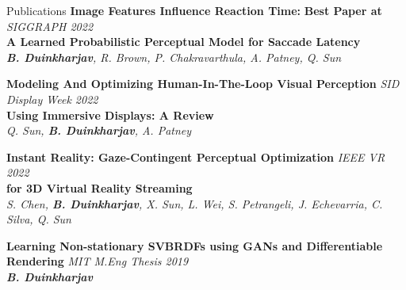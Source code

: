 \documentclass{resume}
\begin{document}
\begin{area}{Publications}
        \textbf{Image Features Influence Reaction Time:}
        \hfill
        \textbf{Best Paper at}
        \emph{SIGGRAPH 2022}\\
        \textbf{A Learned Probabilistic Perceptual Model for Saccade Latency}
        \\%
        \hspace*{2mm}
        \emph{\textbf{B. Duinkharjav}, R. Brown, P. Chakravarthula, A. Patney, Q. Sun}
    \newpage
    \item
        \textbf{Modeling And Optimizing Human-In-The-Loop Visual
        Perception}
        \hfill
        \emph{SID Display Week 2022}\\
        \textbf{Using Immersive Displays: A Review}
        \\%
        \hspace*{2mm}
        \emph{Q. Sun, \textbf{B. Duinkharjav}, A. Patney}
    \item
        \textbf{Instant Reality: Gaze-Contingent Perceptual Optimization}
        \hfill
        \emph{IEEE VR 2022}\\
        \textbf{for 3D Virtual Reality Streaming}
        \\%
        \hspace*{2mm}
        \emph{S. Chen, \textbf{B. Duinkharjav}, X. Sun, L. Wei, S. Petrangeli, J. Echevarria, C. Silva, Q. Sun}
    \item
        \textbf{Learning Non-stationary SVBRDFs using GANs and Differentiable Rendering}
        \hfill
        \emph{MIT M.Eng Thesis 2019}
        \\%
        \hspace*{2mm}
        \emph{\textbf{B. Duinkharjav}}
\end{area}
\end{document}
